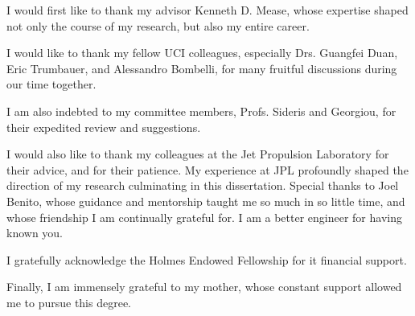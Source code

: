 \acknowledgments
{
  I would first like to thank my advisor Kenneth D. Mease, whose expertise shaped not only the course of my research, but also my entire career. 
  
  I would like to thank my fellow UCI colleagues, especially Drs. Guangfei Duan, Eric Trumbauer, and Alessandro Bombelli, for many fruitful discussions during our time together.
  
  I am also indebted to my committee members, Profs. Sideris and Georgiou, for their expedited review and suggestions. 
  
  I would also like to thank my colleagues at the Jet Propulsion Laboratory for their advice, and for their patience. My experience at JPL profoundly shaped the direction of my research culminating in this dissertation. Special thanks to Joel Benito, whose guidance and mentorship taught me so much in so little time, and whose friendship I am continually grateful for. I am a better engineer for having known you. 
  
  I gratefully acknowledge the Holmes Endowed Fellowship for it financial support. 
  
  Finally, I am immensely grateful to my mother, whose constant support allowed me to pursue this degree.
  
}


\newcommand{\mypubentry}[3]{
  \begin{tabular*}{1\textwidth}{@{\extracolsep{\fill}}p{4.5in}r}
    \textbf{#1} & \textbf{#2} \\ 
    \multicolumn{2}{@{\extracolsep{\fill}}p{.95\textwidth}}{#3}\vspace{6pt} \\
  \end{tabular*}
}
\newcommand{\mysoftentry}[3]{
  \begin{tabular*}{1\textwidth}{@{\extracolsep{\fill}}lr}
    \textbf{#1} & \url{#2} \\
    \multicolumn{2}{@{\extracolsep{\fill}}p{.95\textwidth}}
    {\emph{#3}}\vspace{-6pt} \\
  \end{tabular*}
}

